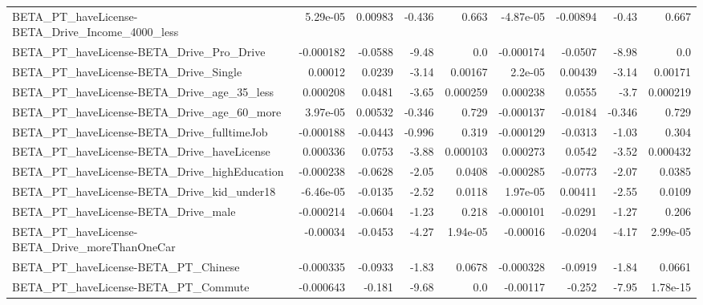 \begin{tabular}{lrrrrrrrr}
BETA\_PT\_haveLicense-BETA\_Drive\_Income\_4000\_less    &    5.29e-05 &      0.00983 &    -0.436 &    0.663 &  -4.87e-05 &    -0.00894 &        -0.43 &         0.667 \\
BETA\_PT\_haveLicense-BETA\_Drive\_Pro\_Drive           &   -0.000182 &      -0.0588 &     -9.48 &      0.0 &  -0.000174 &     -0.0507 &        -8.98 &           0.0 \\
BETA\_PT\_haveLicense-BETA\_Drive\_Single              &     0.00012 &       0.0239 &     -3.14 &  0.00167 &    2.2e-05 &     0.00439 &        -3.14 &       0.00171 \\
BETA\_PT\_haveLicense-BETA\_Drive\_age\_35\_less         &    0.000208 &       0.0481 &     -3.65 & 0.000259 &   0.000238 &      0.0555 &         -3.7 &      0.000219 \\
BETA\_PT\_haveLicense-BETA\_Drive\_age\_60\_more         &    3.97e-05 &      0.00532 &    -0.346 &    0.729 &  -0.000137 &     -0.0184 &       -0.346 &         0.729 \\
BETA\_PT\_haveLicense-BETA\_Drive\_fulltimeJob         &   -0.000188 &      -0.0443 &    -0.996 &    0.319 &  -0.000129 &     -0.0313 &        -1.03 &         0.304 \\
BETA\_PT\_haveLicense-BETA\_Drive\_haveLicense         &    0.000336 &       0.0753 &     -3.88 & 0.000103 &   0.000273 &      0.0542 &        -3.52 &      0.000432 \\
BETA\_PT\_haveLicense-BETA\_Drive\_highEducation       &   -0.000238 &      -0.0628 &     -2.05 &   0.0408 &  -0.000285 &     -0.0773 &        -2.07 &        0.0385 \\
BETA\_PT\_haveLicense-BETA\_Drive\_kid\_under18         &   -6.46e-05 &      -0.0135 &     -2.52 &   0.0118 &   1.97e-05 &     0.00411 &        -2.55 &        0.0109 \\
BETA\_PT\_haveLicense-BETA\_Drive\_male                &   -0.000214 &      -0.0604 &     -1.23 &    0.218 &  -0.000101 &     -0.0291 &        -1.27 &         0.206 \\
BETA\_PT\_haveLicense-BETA\_Drive\_moreThanOneCar      &    -0.00034 &      -0.0453 &     -4.27 & 1.94e-05 &   -0.00016 &     -0.0204 &        -4.17 &      2.99e-05 \\
BETA\_PT\_haveLicense-BETA\_PT\_Chinese                &   -0.000335 &      -0.0933 &     -1.83 &   0.0678 &  -0.000328 &     -0.0919 &        -1.84 &        0.0661 \\
BETA\_PT\_haveLicense-BETA\_PT\_Commute                &   -0.000643 &       -0.181 &     -9.68 &      0.0 &   -0.00117 &      -0.252 &        -7.95 &      1.78e-15 \\

\end{tabular}
